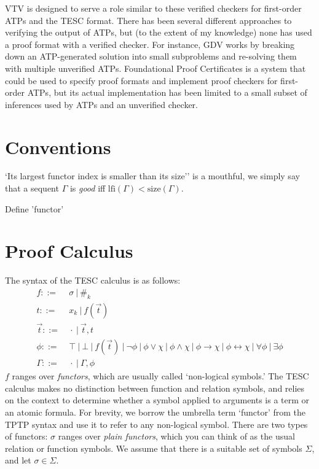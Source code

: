 \documentclass[12pt]{article}
\newcommand{\idf}[1]{\#_{#1}}
\newcommand{\lfi}[0]{\mathrm{lfi}}
\newcommand{\size}[0]{\mathrm{size}}
\begin{document}
VTV is designed to serve a role similar to these verified checkers for first-order ATPs
and the TESC format.
There has been several different approaches to verifying the output of ATPs, but 
(to the extent of my knowledge) none has used a proof format with a verified checker. 
For instance, GDV \cite{sutcliffe2006semantic} works by breaking down an ATP-generated 
solution into small subproblems and re-solving them with multiple unverified ATPs. 
Foundational Proof Certificates \cite{chihani2013foundational} is a system that could 
be used to specify proof formats and implement proof checkers for first-order ATPs,
but its actual implementation \cite{chihani2015proof} has been limited to a small 
subset of inferences used by ATPs and an unverified checker.


\section{Conventions}

`Its largest functor index is smaller than its size'' is a mouthful, we 
simply say that a sequent $\Gamma$ is \textit{good} iff $\lfi(\Gamma) < \size(\Gamma)$.

Define 'functor'

\section{Proof Calculus} \label{set:proof-calc} 

The syntax of the TESC calculus is as follows:
\begin{align*}
f ::= &\ \sigma\ |\ \idf{k}\\
t ::= &\ x_k\ |\ f(\vec{t})\\
\vec{t} ::= &\ \cdot\ |\ \vec{t}, t\\
\phi ::= &\ \top\ |\ \bot\ |\ f(\vec{t})\ |\ \lnot \phi\ |\ \phi \lor \chi\ |\ \phi \land \chi\ |\ \phi \to \chi\ |\ \phi \leftrightarrow \chi\ |\ \forall \phi\ |\ \exists \phi\\
\Gamma ::= &\ \cdot\ |\ \Gamma, \phi
\end{align*}
$f$ ranges over \textit{functors}, which are usually called `non-logical symbols.'
The TESC calculus makes no distinction
between function and relation symbols, and relies on the context to determine whether 
a symbol applied to arguments is a term or an atomic formula. For brevity, we borrow
the umbrella term `functor' from the TPTP syntax and use it to refer to any non-logical symbol.
There are two types of functors: $\sigma$ ranges over \textit{plain functors}, 
which you can think of as the usual relation or function symbols. We assume that there 
is a suitable set of symbols $\Sigma$, and let $\sigma \in \Sigma$.
\end{document}
